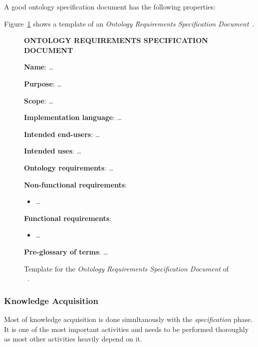 A good ontology specification document has the following properties:

Figure~\ref{fig:ontology_specification_template} shows a template of an \emph{Ontology Requirements Specification Document}~\cite{ORSD}.

\begin{figure}
\begin{mdframed}[linewidth=.6pt]
\setlength{\parindent}{0pt}
\MakeUppercase{\textbf{Ontology Requirements Specification Document}}

\textbf{Name}: …

\textbf{Purpose}: …

\textbf{Scope}: …

\textbf{Implementation language}: …

\textbf{Intended end-users}: …

\textbf{Intended uses}: …

\textbf{Ontology requirements}: …

\setlength{\leftskip}{.5cm}

\textbf{Non-functional requirements}: 

\begin{itemize}
  \item …
\end{itemize}

\textbf{Functional requirements}: 

\begin{itemize}
  \item …
\end{itemize}

\setlength{\leftskip}{0cm}

\textbf{Pre-glossary of terms}: …

\end{mdframed}

\caption[Template for the \emph{Ontology Requirements Specification Document}]{Template for the \emph{Ontology Requirements Specification Document} of \methontology~\cite{ORSD}.}
\label{fig:ontology_specification_template}
\end{figure}

\subsubsection{Knowledge Acquisition}

Most of knowledge acquisition is done simultanously with the \emph{specification} phase. It is one of the most important activities and needs to be performed thoroughly as most other activities heavily depend on it.

